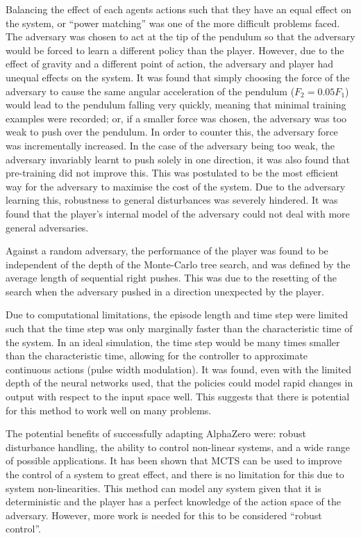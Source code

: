 \documentclass[../main.tex]{subfiles}
\begin{document}
Balancing the effect of each agents actions such that they have an equal effect on the system, or ``power matching'' was one of the more difficult problems faced. The adversary was chosen to act at the tip of the pendulum so that the adversary would be forced to learn a different policy than the player. However, due to the effect of gravity and a different point of action, the adversary and player had unequal effects on the system. It was found that simply choosing the force of the adversary to cause the same angular acceleration of the pendulum ($F_2 = 0.05F_1$) would lead to the pendulum falling very quickly, meaning that minimal training examples were recorded; or, if a smaller force was chosen, the adversary was too weak to push over the pendulum. In order to counter this, the adversary force was incrementally increased. In the case of the adversary being too weak, the adversary invariably learnt to push solely in one direction, it was also found that pre-training did not improve this. This was postulated to be the most efficient way for the adversary to maximise the cost of the system. Due to the adversary learning this, robustness to general disturbances was severely hindered. It was found that the player's internal model of the adversary could not deal with more general adversaries.

Against a random adversary, the performance of the player was found to be independent of the depth of the Monte-Carlo tree search, and was defined by the average length of sequential right pushes. This was due to the resetting of the search when the adversary pushed in a direction unexpected by the player.

Due to computational limitations, the episode length and time step were limited such that the time step was only marginally faster than the characteristic time of the system. In an ideal simulation, the time step would be many times smaller than the characteristic time, allowing for the controller to approximate continuous actions (pulse width modulation). It was found, even with the limited depth of the neural networks used, that the policies could model rapid changes in output with respect to the input space well. This suggests that there is potential for this method to work well on many problems. 

The potential benefits of successfully adapting AlphaZero were: robust disturbance handling, the ability to control non-linear systems, and a wide range of possible applications. It has been shown that MCTS can be used to improve the control of a system to great effect, and there is no limitation for this due to system non-linearities. This method can model any system given that it is deterministic and the player has a perfect knowledge of the action space of the adversary. However, more work is needed for this to be considered ``robust control''.
\end{document}
